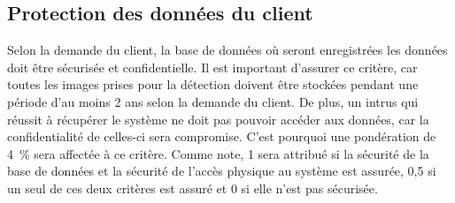 

\subsection{Protection des données du client}
\label{s:cdc_sec_protdonnclnt}

Selon la demande du client, la base de données où seront enregistrées les données doit être sécurisée et confidentielle.
Il est important d’assurer ce critère, car toutes les images prises pour la détection doivent être stockées pendant une période d’au moins 2 ans selon la demande du client.
De plus, un intrus qui réussit à récupérer le système ne doit pas pouvoir accéder aux données, car la confidentialité de celles-ci sera compromise.
C’est pourquoi une pondération de 4~\% sera affectée à ce critère.
Comme note, 1 sera attribué si la sécurité de la base de données et la sécurité de l’accès physique au système est assurée, 0,5 si un seul de ces deux critères est assuré et 0 si elle n’est pas sécurisée.